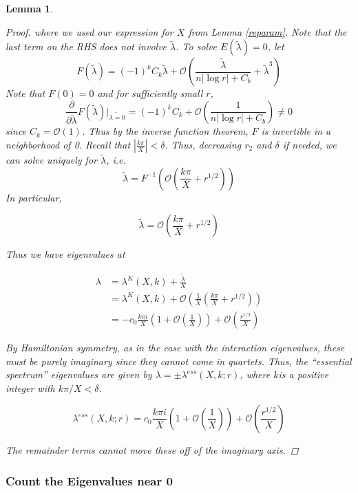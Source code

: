 \documentclass[12pt]{article}
\newtheorem{lemma}{Lemma}
\begin{document}
\begin{lemma}
\begin{proof}
where we used our expression for $X$ from Lemma \ref{reparam}. Note that the last term on the RHS does not involve $\tilde{\lambda}$. To solve $E(\tilde{\lambda}) = 0$, let
\[
F(\tilde{\lambda}) = (-1)^k C_k \tilde{\lambda} + \mathcal{O}\left( \frac{\tilde{\lambda}}{n|\log r| + C_b} + \tilde{\lambda}^3 \right)
\]
Note that $F(0) = 0$ and for sufficiently small $r$, 
\[
\frac{\partial}{\partial\tilde{\lambda}}F(\tilde{\lambda})\big|_{\tilde{\lambda = 0}}
= (-1)^k C_k + \mathcal{O}\left( \frac{1}{n|\log r| + C_b} \right) \neq 0
\]
since $C_k = \mathcal{O}(1)$. Thus by the inverse function theorem, $F$ is invertible in a neighborhood of 0. Recall that  $|\frac{k \pi}{X}| < \delta$. Thus, decreasing $r_2$ and $\delta$ if needed, we can solve uniquely for $\tilde{\lambda}$, i.e. 
\[
\tilde{\lambda} = F^{-1}\left( \mathcal{O} \left( \frac{k \pi}{X} + r^{1/2} \right)\right)
\]
In particular,

\[
\tilde{\lambda} = \mathcal{O}\left( \frac{k \pi}{X} + r^{1/2} \right)
\]

Thus we have eigenvalues at

\begin{align*}
\lambda &= \lambda^K(X,k) + \frac{\tilde{\lambda}}{X} \\
&= \lambda^K(X,k) + \mathcal{O}\left( \frac{1}{X} \left( \frac{k \pi}{X} + r^{1/2} \right) \right)\\
&= -c_0 \frac{k \pi i }{X} \left( 1 + \mathcal{O}\left( \frac{1}{X} \right)\right) + \mathcal{O}\left( \frac{r^{1/2}}{X} \right)
\end{align*}

By Hamiltonian symmetry, as in the case with the interaction eigenvalues, these must be purely imaginary since they cannot come in quartets. Thus, the ``essential spectrum'' eigenvalues are given by $\lambda = \pm \lambda^{ess}(X, k; r)$, where $k$is a positive integer with $k \pi/X < \delta$.

\[
\lambda^{ess}(X, k; r) = c_0 \frac{k \pi i }{X} \left( 1 + \mathcal{O}\left( \frac{1}{X} \right)\right) + \mathcal{O}\left( \frac{r^{1/2}}{X} \right)
\]

The remainder terms cannot move these off of the imaginary axis.

\end{proof}
\end{lemma}

\subsubsection{Count the Eigenvalues near 0}
\end{document}
